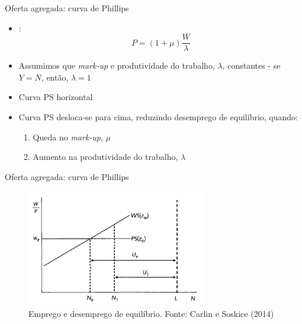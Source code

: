 \documentclass[10pt]{beamer}
\begin{document}
\begin{frame}
    {Oferta agregada: curva de Phillips}
    \begin{itemize}
        \item {}:
        \begin{equation}
            P = (1 + \mu)\frac{W}{\lambda}
        \end{equation}
        \item Assumimos que \emph{mark-up} e produtividade do trabalho, $\lambda$, constantes - se $Y = N$, então, $\lambda = 1$\bigskip
        \item Curva PS horizontal\bigskip
        \item Curva PS desloca-se para cima, reduzindo desemprego de equilíbrio, quando:\medskip
        \begin{enumerate}
            \item Queda no \emph{mark-up}, $\mu$\medskip
            \item Aumento na produtividade do trabalho, $\lambda$
        \end{enumerate}
    \end{itemize}
\end{frame}

\begin{frame}
    {Oferta agregada: curva de Phillips}
    \begin{figure}
        \includegraphics[width=0.7\textwidth]{./figures/aula14_fig1.PNG}
        \caption{Emprego e desemprego de equilíbrio. Fonte: Carlin e Soskice (2014)}
    \end{figure}
\end{frame}
\end{document}
